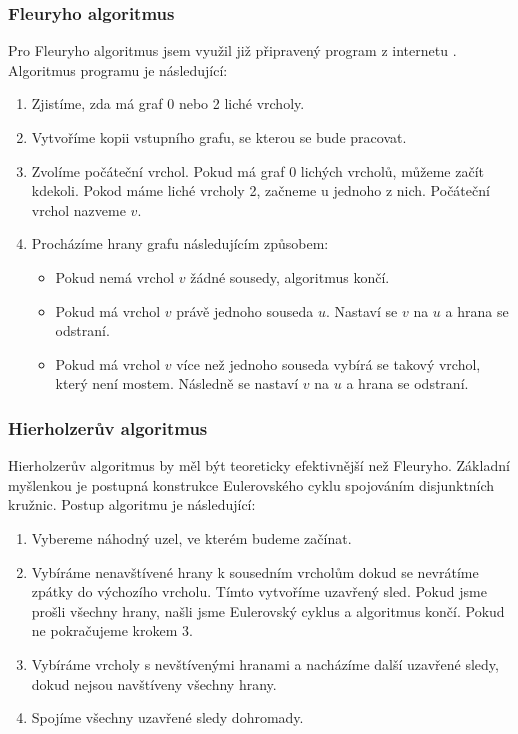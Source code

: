 \documentclass[12pt]{article}
\begin{document}
\subsubsection{Fleuryho algoritmus}
Pro Fleuryho algoritmus jsem využil již připravený program z internetu \cite{Geeks2}. Algoritmus programu je následující:
\begin{enumerate}
\item Zjistíme, zda má graf 0 nebo 2 liché vrcholy.
\item Vytvoříme kopii vstupního grafu, se kterou se bude pracovat.
\item Zvolíme počáteční vrchol. Pokud má graf 0 lichých vrcholů, můžeme začít kdekoli. Pokod máme liché vrcholy 2, začneme u jednoho z nich. Počáteční vrchol nazveme $v$.
\item Procházíme hrany grafu následujícím způsobem:
	\begin{itemize}
	\item Pokud nemá vrchol $v$ žádné sousedy, algoritmus končí.
	\item Pokud má vrchol $v$ právě jednoho souseda $u$. Nastaví se $v$ na $u$ a hrana se odstraní.
	\item Pokud má vrchol $v$ více než jednoho souseda vybírá se takový vrchol, který není mostem. Následně se nastaví $v$ na $u$ a hrana se odstraní.
	\end{itemize}
\end{enumerate}

\subsubsection{Hierholzerův algoritmus}
Hierholzerův algoritmus by měl být teoreticky efektivnější než Fleuryho. Základní myšlenkou je postupná konstrukce Eulerovského cyklu spojováním disjunktních kružnic. Postup algoritmu je následující:
\begin{enumerate}
\item Vybereme náhodný uzel, ve kterém budeme začínat.
\item Vybíráme nenavštívené hrany k sousedním vrcholům dokud se nevrátíme zpátky do výchozího vrcholu. Tímto vytvoříme uzavřený sled. Pokud jsme prošli všechny hrany, našli jsme Eulerovský cyklus a algoritmus končí. Pokud ne pokračujeme krokem 3.
\item Vybíráme vrcholy s nevštívenými hranami a nacházíme další uzavřené sledy, dokud nejsou navštíveny všechny hrany.
\item Spojíme všechny uzavřené sledy dohromady.
\end{enumerate}
\end{document}
